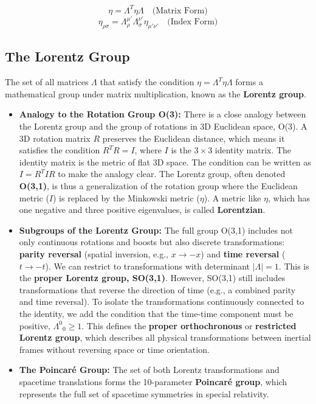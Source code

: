 \documentclass[11pt, a4paper]{report}
\begin{document}
\begin{equation}\label{eq:lorentz-condition}
    \eta = \Lambda^T \eta \Lambda \quad \text{(Matrix Form)}
\end{equation}
\begin{equation}
    \eta_{\rho\sigma} = \Lambda^{\mu'}_\rho \Lambda^{\nu'}_\sigma \eta_{\mu'\nu'} \quad \text{(Index Form)}
\end{equation}

\subsection*{The Lorentz Group}

The set of all matrices $\Lambda$ that satisfy the condition $\eta = \Lambda^T \eta \Lambda$ forms a mathematical group under matrix multiplication, known as the \textbf{Lorentz group}.

\begin{itemize}
    \item \textbf{Analogy to the Rotation Group O(3):}
    There is a close analogy between the Lorentz group and the group of rotations in 3D Euclidean space, O(3). A 3D rotation matrix $R$ preserves the Euclidean distance, which means it satisfies the condition $R^T R = I$, where $I$ is the $3 \times 3$ identity matrix. The identity matrix is the metric of flat 3D space. The condition can be written as $I = R^T I R$ to make the analogy clear. The Lorentz group, often denoted \textbf{O(3,1)}, is thus a generalization of the rotation group where the Euclidean metric ($I$) is replaced by the Minkowski metric ($\eta$). A metric like $\eta$, which has one negative and three positive eigenvalues, is called \textbf{Lorentzian}.

    \item \textbf{Subgroups of the Lorentz Group:}
    The full group O(3,1) includes not only continuous rotations and boosts but also discrete transformations: \textbf{parity reversal} (spatial inversion, e.g., $x \rightarrow -x$) and \textbf{time reversal} ($t \rightarrow -t$). We can restrict to transformations with determinant $|\Lambda|=1$. This is the \textbf{proper Lorentz group, SO(3,1)}. However, SO(3,1) still includes transformations that reverse the direction of time (e.g., a combined parity and time reversal). To isolate the transformations continuously connected to the identity, we add the condition that the time-time component must be positive, ${\Lambda^0}_0 \ge 1$. This defines the \textbf{proper orthochronous} or \textbf{restricted Lorentz group}, which describes all physical transformations between inertial frames without reversing space or time orientation.

    \item \textbf{The Poincaré Group:} The set of both Lorentz transformations and spacetime translations forms the 10-parameter \textbf{Poincaré group}, which represents the full set of spacetime symmetries in special relativity.
\end{itemize}
\end{document}
